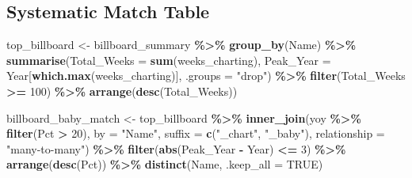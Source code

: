\documentclass[
]{article}
\newenvironment{Shaded}{\begin{snugshade}}{\end{snugshade}}
\newcommand{\AttributeTok}[1]{\textcolor[rgb]{0.13,0.29,0.53}{#1}}
\newcommand{\ConstantTok}[1]{\textcolor[rgb]{0.56,0.35,0.01}{#1}}
\newcommand{\DecValTok}[1]{\textcolor[rgb]{0.00,0.00,0.81}{#1}}
\newcommand{\FunctionTok}[1]{\textcolor[rgb]{0.13,0.29,0.53}{\textbf{#1}}}
\newcommand{\NormalTok}[1]{#1}
\newcommand{\OtherTok}[1]{\textcolor[rgb]{0.56,0.35,0.01}{#1}}
\newcommand{\SpecialCharTok}[1]{\textcolor[rgb]{0.81,0.36,0.00}{\textbf{#1}}}
\newcommand{\StringTok}[1]{\textcolor[rgb]{0.31,0.60,0.02}{#1}}
\begin{document}
\subsection{Systematic Match Table}\label{systematic-match-table}

\begin{Shaded}
\begin{Highlighting}[]
\NormalTok{top\_billboard }\OtherTok{\textless{}{-}}\NormalTok{ billboard\_summary }\SpecialCharTok{\%\textgreater{}\%}
    \FunctionTok{group\_by}\NormalTok{(Name) }\SpecialCharTok{\%\textgreater{}\%}
    \FunctionTok{summarise}\NormalTok{(}\AttributeTok{Total\_Weeks =} \FunctionTok{sum}\NormalTok{(weeks\_charting),}
              \AttributeTok{Peak\_Year   =}\NormalTok{ Year[}\FunctionTok{which.max}\NormalTok{(weeks\_charting)],}
              \AttributeTok{.groups =} \StringTok{"drop"}\NormalTok{) }\SpecialCharTok{\%\textgreater{}\%}
    \FunctionTok{filter}\NormalTok{(Total\_Weeks }\SpecialCharTok{\textgreater{}=} \DecValTok{100}\NormalTok{) }\SpecialCharTok{\%\textgreater{}\%}
    \FunctionTok{arrange}\NormalTok{(}\FunctionTok{desc}\NormalTok{(Total\_Weeks))}

\NormalTok{billboard\_baby\_match }\OtherTok{\textless{}{-}}\NormalTok{ top\_billboard }\SpecialCharTok{\%\textgreater{}\%}
    \FunctionTok{inner\_join}\NormalTok{(yoy }\SpecialCharTok{\%\textgreater{}\%} \FunctionTok{filter}\NormalTok{(Pct }\SpecialCharTok{\textgreater{}} \DecValTok{20}\NormalTok{), }\AttributeTok{by =} \StringTok{"Name"}\NormalTok{,}
               \AttributeTok{suffix =} \FunctionTok{c}\NormalTok{(}\StringTok{"\_chart"}\NormalTok{, }\StringTok{"\_baby"}\NormalTok{), }\AttributeTok{relationship =} \StringTok{"many{-}to{-}many"}\NormalTok{) }\SpecialCharTok{\%\textgreater{}\%}
    \FunctionTok{filter}\NormalTok{(}\FunctionTok{abs}\NormalTok{(Peak\_Year }\SpecialCharTok{{-}}\NormalTok{ Year) }\SpecialCharTok{\textless{}=} \DecValTok{3}\NormalTok{) }\SpecialCharTok{\%\textgreater{}\%}
    \FunctionTok{arrange}\NormalTok{(}\FunctionTok{desc}\NormalTok{(Pct)) }\SpecialCharTok{\%\textgreater{}\%}
    \FunctionTok{distinct}\NormalTok{(Name, }\AttributeTok{.keep\_all =} \ConstantTok{TRUE}\NormalTok{)}


\end{Highlighting}
\end{Shaded}
\end{document}
